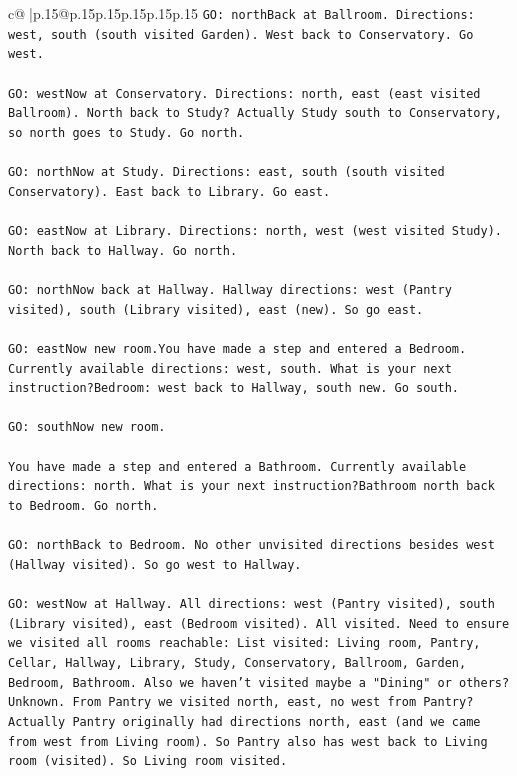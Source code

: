 \documentclass{article}
\begin{document}
{\begin{supertabular}{c@{$\;$}|p{.15\linewidth}@{}p{.15\linewidth}p{.15\linewidth}p{.15\linewidth}p{.15\linewidth}p{.15\linewidth}}
{{{\texttt{GO: northBack at Ballroom. Directions: west, south (south visited Garden). West back to Conservatory. Go west.} \\
\\ 
\texttt{GO: westNow at Conservatory. Directions: north, east (east visited Ballroom). North back to Study? Actually Study south to Conservatory, so north goes to Study. Go north.} \\
\\ 
\texttt{GO: northNow at Study. Directions: east, south (south visited Conservatory). East back to Library. Go east.} \\
\\ 
\texttt{GO: eastNow at Library. Directions: north, west (west visited Study). North back to Hallway. Go north.} \\
\\ 
\texttt{GO: northNow back at Hallway. Hallway directions: west (Pantry visited), south (Library visited), east (new). So go east.} \\
\\ 
\texttt{GO: eastNow new room.You have made a step and entered a Bedroom. Currently available directions: west, south. What is your next instruction?Bedroom: west back to Hallway, south new. Go south.} \\
\\ 
\texttt{GO: southNow new room.} \\
\\ 
\texttt{You have made a step and entered a Bathroom. Currently available directions: north. What is your next instruction?Bathroom north back to Bedroom. Go north.} \\
\\ 
\texttt{GO: northBack to Bedroom. No other unvisited directions besides west (Hallway visited). So go west to Hallway.} \\
\\ 
\texttt{GO: westNow at Hallway. All directions: west (Pantry visited), south (Library visited), east (Bedroom visited). All visited. Need to ensure we visited all rooms reachable: List visited: Living room, Pantry, Cellar, Hallway, Library, Study, Conservatory, Ballroom, Garden, Bedroom, Bathroom. Also we haven't visited maybe a "Dining" or others? Unknown. From Pantry we visited north, east, no west from Pantry? Actually Pantry originally had directions north, east (and we came from west from Living room). So Pantry also has west back to Living room (visited). So Living room visited.} \\
\\ 
}}}
\end{supertabular}}
\end{document}
